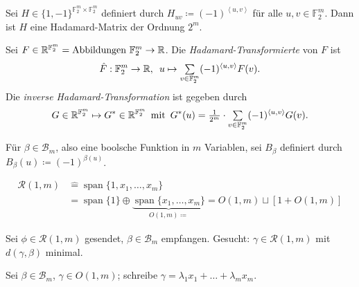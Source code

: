 \documentclass{cheat-sheet}
\newcommand{\F}{\mathbb{F}} %
\DeclareMathOperator{\spann}{span} %
\newcommand{\scp}[2]{\left\langle #1, #2 \right\rangle} %
\newcommand{\RM}{\mathcal{R}} %
\begin{document}

\begin{prop}
  Sei $H \in \{ 1, -1 \}^{\F_2^m \times \F_2^m}$ definiert durch $H_{uv} \coloneqq (-1)^{\scp{u}{v}}$ für alle $u, v \in \F_2^m$.
  Dann ist $H$ eine Hadamard-Matrix der Ordnung $2^m$.
\end{prop}


\begin{defn}
  Sei $F \in \R^{\F_2^m} = \text{Abbildungen } \F_2^m \to \R$.
  Die \emph{Hadamard-Transformierte} von $F$ ist
  \[
    \hat{F} : \F_2^m \to \R, \enspace
    u \mapsto \sum_{v \in \F_2^m} (-1)^{\scp{u}{v}} F(v).
  \]
  Die \emph{inverse Hadamard-Transformation} ist gegeben durch
  \[
    G \in \R^{\F_2^m} \mapsto G^* \in \R^{\F_2^m}
    \enspace \text{mit} \enspace
    G^*(u) = \tfrac{1}{2^m} \cdot \sum_{v \in \F_2^m} (-1)^{\scp{u}{v}} G(v).
  \]
\end{defn}

\begin{nota}
  Für $\beta \in \mathcal{B}_m$, also eine boolsche Funktion in $m$ Variablen, sei $B_\beta$ definiert durch $B_\beta(u) \coloneqq (-1)^{\beta(u)}$.
\end{nota}


\begin{align*}
  \RM(1, m) & \widehat{=} \spann \{ 1, x_1, \ldots, x_m \} \\
  & = \spann \{ 1 \} \oplus \underbrace{\spann \{ x_1, \ldots, x_m \}}_{O(1, m) \coloneqq} = O(1, m) \sqcup [1 + O(1, m)]
\end{align*}

Sei $\phi \in \RM(1, m)$ gesendet, $\beta \in \mathcal{B}_m$ empfangen.
Gesucht: $\gamma \in \RM(1, m)$ mit $d(\gamma, \beta)$ minimal.

\begin{satz}
  Sei $\beta \in \mathcal{B}_m$, $\gamma \in O(1, m)$; schreibe $\gamma = \lambda_1 x_1 + \ldots + \lambda_m x_m$.
  \begin{itemize}
  \end{itemize}
\end{satz}
\end{document}
